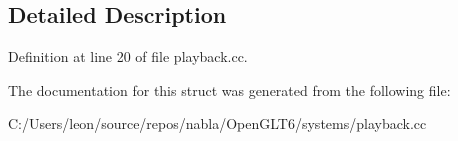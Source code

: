 \subsection{Detailed Description}


Definition at line 20 of file playback.\+cc.



The documentation for this struct was generated from the following file\+:\begin{DoxyCompactItemize}
\item 
C\+:/\+Users/leon/source/repos/nabla/\+Open\+G\+L\+T6/systems/playback.\+cc\end{DoxyCompactItemize}
